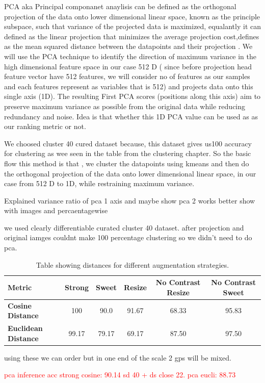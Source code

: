 PCA  aka Principal componanet anaylisis can be defined as the orthogonal projection of the data onto lower dimensional linear space, known as the principle subspace, such that variance of the projected data is maximized, equalantly it can defined as the linear projection that minimizes the average projection cost,defines as the mean squared distance between the datapoints and their projection \cite{bishop:2006:PRML}. We will use the PCA technique to identify the direction of maximum variance in the high dimensional feature space in our case 512 D ( since before projection head feature vector have 512 features, we will consider no of features as our samples and each features represent as variables that is 512) and projects data onto this single axis (1D). The resulting First PCA scores (positions along this axis) aim to preserve maximum variance as possible from the original data while reducing redundancy and noise.  Idea is that whether this 1D PCA value can be used as as our ranking metric or not.

We choosed cluster 40 cured dataset because, this dataset gives us100 accuracy for clustering as wee seen in the table from the clustering chapter. So the basic flow this method is that , we cluster the datapoints using kmeans and then do the  orthogonal projection of the data onto lower dimensional linear space, in our case from 512 D to 1D, while restraining maximum variance.

Explained variance ratio  of pca 1 axis and maybe show pca 2 works better show with images and percaentagewise

we used clearly differentiable curated cluster 40 dataset. after projection and original iamges couldnt make 100 percentage clustering so we didn't need to do pca.

\begin{table}[H]
    \centering
    \begin{tabular}{@{}lccccc@{}}
    \toprule
    \textbf{Metric}          & \textbf{Strong} & \textbf{Sweet} & \textbf{Resize} & \textbf{No Contrast Resize} & \textbf{No Contrast Sweet} \\ \midrule
    \textbf{Cosine Distance} & 100                & 90.0              & 91.67               & 68.33                          & 95.83                          \\
    \textbf{Euclidean Distance} & 99.17           & 79.17              & 69.17               & 87.50                           & 97.50                          \\ \bottomrule
    \end{tabular}
    \caption{Table showing distances for different augmentation strategies.}
    \label{tab:distances}
  \end{table}

using these we can order but in one end of the scale 2 gps will be mixed.


\textcolor{red}{pca inference acc strong cosine: 90.14 sd 40 + ds close 22. pca eucli: 88.73}


